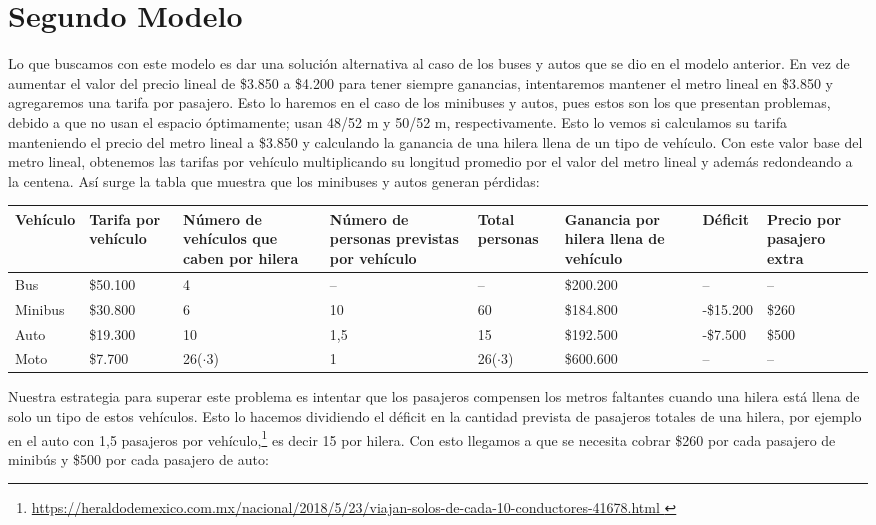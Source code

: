 \documentclass[a4paper]{article}
\begin{document}
\section{Segundo Modelo}
Lo que buscamos con este modelo es dar una solución alternativa al caso de los buses y autos que se dio en el modelo anterior. En vez de aumentar el valor del precio lineal de \$3.850 a \$4.200 para tener siempre ganancias, intentaremos mantener el metro lineal en \$3.850 y agregaremos una tarifa por pasajero. Esto lo haremos en el caso de los minibuses y autos, pues estos son los que presentan problemas, debido a que no usan el espacio óptimamente; usan 48/52 m y 50/52 m, respectivamente. Esto lo vemos si calculamos su tarifa manteniendo el precio del metro lineal a \$3.850 y calculando la ganancia de una hilera llena de un tipo de vehículo. Con este valor base del metro lineal, obtenemos las tarifas por vehículo multiplicando su longitud promedio por el valor del metro lineal y además redondeando a la centena. Así surge la tabla que muestra que los minibuses y autos generan pérdidas:
\begin{table}[ht]
    \centering
    \begin{adjustbox}{width=1\textwidth}
\small
\begin{tabular}{|M{1.2cm}|M{1.2cm}|M{1.2cm}|M{1.2cm}|M{1.2cm}|M{1.2cm}|M{1.2cm}|M{1.2cm}|}
       \hline
      Vehículo & Tarifa por vehículo & Número de vehículos que caben por hilera&Número de personas previstas por vehículo&Total personas&
Ganancia por hilera llena de vehículo&Déficit&Precio por pasajero extra\\
       \hline
      Bus & \$50.100 & 4&--&--&\$200.200&--&--\\  
      \hline
      Minibus & \$30.800 & 6&10&60&\$184.800&-\$15.200&\$260\\  
      \hline
      Auto & \$19.300 & 10&1,5&15&\$192.500&-\$7.500&\$500\\  
      \hline
      Moto & \$7.700 & 26($\cdot 3$)&1& 26($\cdot 3$) &\$600.600&--&--\\  
     \hline
    \end{tabular}
    \end{adjustbox}
\end{table}\newline 
Nuestra estrategia para superar este problema es intentar que los pasajeros compensen los metros faltantes cuando una hilera está llena de solo un tipo de estos vehículos. Esto lo hacemos dividiendo el déficit en la cantidad prevista de pasajeros totales de una hilera, por ejemplo en el auto con 1,5 pasajeros por vehículo,\footnote{\url{ https://heraldodemexico.com.mx/nacional/2018/5/23/viajan-solos-de-cada-10-conductores-41678.html }} es decir 15 por hilera. Con esto llegamos a que se necesita cobrar  \$260 por cada pasajero de  minibús y \$500 por cada pasajero de auto:\newline\newline
\end{document}
